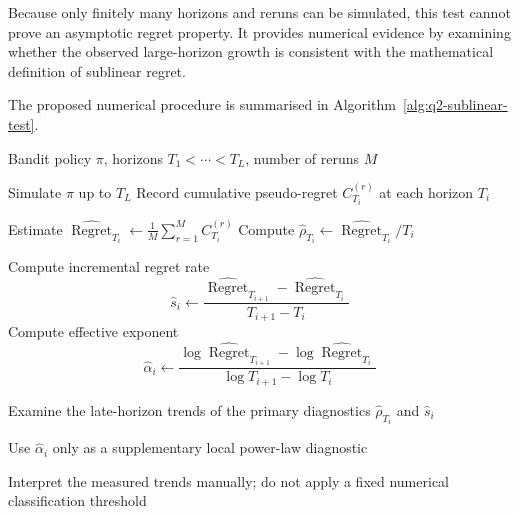 Because only finitely many horizons and reruns can be simulated, this test
cannot prove an asymptotic regret property. It provides numerical evidence
by examining whether the observed large-horizon growth is consistent with
the mathematical definition of sublinear regret.


The proposed numerical procedure is summarised in
Algorithm~\ref{alg:q2-sublinear-test}.

\begin{algorithm}[H]
\caption{Multi-horizon numerical test for sublinear regret}
\label{alg:q2-sublinear-test}
\begin{algorithmic}[1]
\Require Bandit policy $\pi$, horizons
$T_1<\cdots<T_L$, number of reruns $M$

    \State Simulate $\pi$ up to $T_L$
    \State Record cumulative pseudo-regret
    $C_{T_i}^{(r)}$ at each horizon $T_i$
\EndFor

    \State Estimate
    $\widehat{\operatorname{Regret}}_{T_i}
    \gets \frac{1}{M}\sum_{r=1}^{M}C_{T_i}^{(r)}$
    \State Compute
    $\widehat{\rho}_{T_i}
    \gets \widehat{\operatorname{Regret}}_{T_i}/T_i$
\EndFor

    \State Compute incremental regret rate
    \[
        \widehat{s}_i
        \gets
        \frac{
            \widehat{\operatorname{Regret}}_{T_{i+1}}
            -
            \widehat{\operatorname{Regret}}_{T_i}
        }{
            T_{i+1}-T_i
        }
    \]
    \State Compute effective exponent
    \[
        \widehat{\alpha}_i
        \gets
        \frac{
            \log \widehat{\operatorname{Regret}}_{T_{i+1}}
            -
            \log \widehat{\operatorname{Regret}}_{T_i}
        }{
            \log T_{i+1}-\log T_i
        }
    \]
\EndFor

\State Examine the late-horizon trends of the primary diagnostics
$\widehat{\rho}_{T_i}$ and $\widehat{s}_i$

\State Use $\widehat{\alpha}_i$ only as a supplementary local
power-law diagnostic

\State Interpret the measured trends manually; do not apply a fixed
numerical classification threshold

\end{algorithmic}
\end{algorithm}
